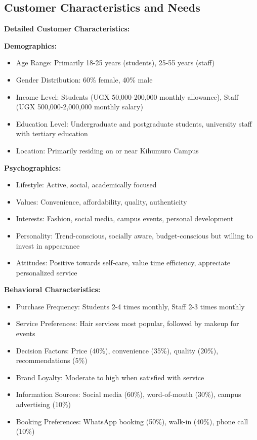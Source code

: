 \documentclass[a4paper,12pt]{article}
\begin{document}
\subsection{Customer Characteristics and Needs}

\textbf{Detailed Customer Characteristics:}

\textbf{Demographics:}
\begin{itemize}[leftmargin=2em]
    \item Age Range: Primarily 18-25 years (students), 25-55 years (staff)
    \item Gender Distribution: 60\% female, 40\% male
    \item Income Level: Students (UGX 50,000-200,000 monthly allowance), Staff (UGX 500,000-2,000,000 monthly salary)
    \item Education Level: Undergraduate and postgraduate students, university staff with tertiary education
    \item Location: Primarily residing on or near Kihumuro Campus
\end{itemize}

\textbf{Psychographics:}
\begin{itemize}[leftmargin=2em]
    \item Lifestyle: Active, social, academically focused
    \item Values: Convenience, affordability, quality, authenticity
    \item Interests: Fashion, social media, campus events, personal development
    \item Personality: Trend-conscious, socially aware, budget-conscious but willing to invest in appearance
    \item Attitudes: Positive towards self-care, value time efficiency, appreciate personalized service
\end{itemize}

\textbf{Behavioral Characteristics:}
\begin{itemize}[leftmargin=2em]
    \item Purchase Frequency: Students 2-4 times monthly, Staff 2-3 times monthly
    \item Service Preferences: Hair services most popular, followed by makeup for events
    \item Decision Factors: Price (40\%), convenience (35\%), quality (20\%), recommendations (5\%)
    \item Brand Loyalty: Moderate to high when satisfied with service
    \item Information Sources: Social media (60\%), word-of-mouth (30\%), campus advertising (10\%)
    \item Booking Preferences: WhatsApp booking (50\%), walk-in (40\%), phone call (10\%)
\end{itemize}
\end{document}
